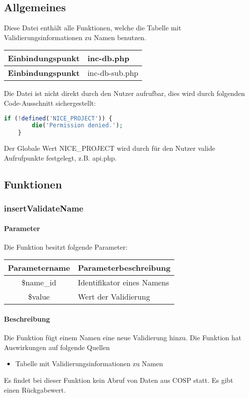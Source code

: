 \subsection{Allgemeines} Diese Datei enthält alle Funktionen, welche die Tabelle mit Validierungsinformationen zu Namen benutzen.
\begin{table}[H]
	\begin{tabular}{|c|p{11cm}|}
		\hline
		\textbf{Einbindungspunkt} & inc-db.php \\ \hline
		\textbf{Einbindungspunkt} & inc-db-sub.php \\ \hline
	\end{tabular}
\end{table}
Die Datei ist nicht direkt durch den Nutzer aufrufbar, dies wird durch folgenden Code-Ausschnitt sichergestellt:
\begin{lstlisting}[language=php]
	if (!defined('NICE_PROJECT')) {
		die('Permission denied.');
	}
\end{lstlisting}
Der Globale Wert {\glqq NICE\_PROJECT\grqq} wird durch für den Nutzer valide Aufrufpunkte festgelegt, z.B. {\glqq api.php\grqq}.
\newpage
\subsection{Funktionen}
\subsubsection{insertValidateName}
\paragraph{Parameter} Die Funktion besitzt folgende Parameter:
\begin{table}[H]
	\begin{tabular}{|c|p{11cm}|}
		\hline
		\textbf{Parametername} & \textbf{Parameterbeschreibung} \\ \hline
		\$name\_id & Identifikator eines Namens \\ \hline
		\$value    & Wert der Validierung \\ \hline
	\end{tabular}
\end{table}
\paragraph{Beschreibung} Die Funktion fügt einem Namen eine neue Validierung hinzu. Die Funktion hat Auswirkungen auf folgende Quellen
\begin{itemize}
	\item Tabelle mit Validierungsinformationen zu Namen
\end{itemize}
Es findet bei dieser Funktion kein Abruf von Daten aus {\glqq COSP\grqq} statt. Es gibt einen Rückgabewert.
